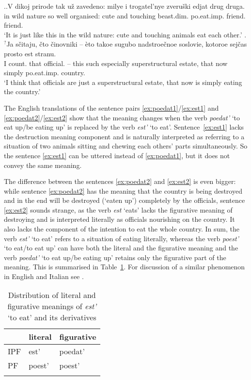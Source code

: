 \ex.\ag.\label{ex:est1}V dikoj prirode tak u\v{z} zavedeno: milye i trogatel'nye zveru\v{s}ki edjat drug druga.\\
in wild nature so well organised: cute and touching beast.dim. po.eat.imp. friend. friend.\\
\trans `It is just like this in the wild nature: cute and touching animals eat each other.'
\bg.$^?$Ja s\v{c}itaju, \v{c}to \v{c}inovniki -- \`{e}to takoe sugubo nadstroe\v{c}noe soslovie, kotoroe sej\v{c}as prosto est stranu.\label{ex:est2}\\
I count. that official. -- this such especially superstructural estate, that now simply po.eat.imp. country.\\
\trans `I think that officials are just a superstructural estate, that now is simply eating the country.'

The English translations of the sentence pairs \ref{ex:poedat1}/\ref{ex:est1} and \ref{ex:poedat2}/\ref{ex:est2} show that  the meaning changes when the verb \textit{poedat'} `to eat up/be eating up' is replaced by the verb \textit{est'} `to eat'. Sentence~\ref{ex:est1} lacks the destruction meaning component and is naturally interpreted as referring to a situation of two animals sitting and chewing each others' parts simultaneously. So the sentence \ref{ex:est1} can be uttered instead of \ref{ex:poedat1}, but it does not convey the same meaning.

The difference between the sentences \ref{ex:poedat2} and \ref{ex:est2} is even bigger: while sentence \ref{ex:poedat2} has the meaning that the country is being destroyed and in the end will be destroyed (`eaten up') completely by the officials, sentence \ref{ex:est2} sounds strange, as the verb \textit{est} `eats' lacks the figurative meaning of destroying and is interpreted literally as officials nourishing on the country. It also lacks the component of the intention to eat the whole country. In sum, the verb \textit{est'} `to eat' refers to a situation of eating literally, whereas the verb \textit{poest'} `to eat/to eat up' can have both the literal and the figurative meaning and the verb \textit{poedat'} `to eat up/be eating up' retains only the figurative part of the meaning. This is summarised in Table~\ref{table:eat}. For discussion of a similar phenomenon in English and Italian see \citet{FolliHarley:05}.

\begin{table}
\caption{Distribution of literal and figurative meanings of \textit{est'} `to eat' and its derivatives \label{table:eat}}
\begin{tabular}{lll}
\lsptoprule
& literal & figurative \\ \midrule
IPF & est' & poedat' \\
PF & poest' & poest' \\ \lspbottomrule
\end{tabular}
\end{table}

